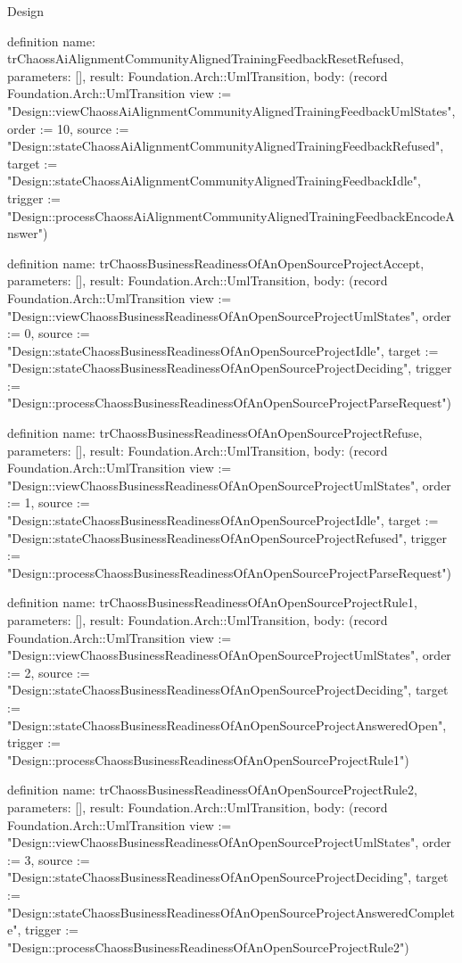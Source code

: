 \begin{lexlean}{Design}
\begin{semanticmodule}
definition{
  name: trChaossAiAlignmentCommunityAlignedTrainingFeedbackResetRefused,
  parameters: [],
  result: Foundation.Arch::UmlTransition,
  body: (record Foundation.Arch::UmlTransition {view := "Design::viewChaossAiAlignmentCommunityAlignedTrainingFeedbackUmlStates", order := 10, source := "Design::stateChaossAiAlignmentCommunityAlignedTrainingFeedbackRefused", target := "Design::stateChaossAiAlignmentCommunityAlignedTrainingFeedbackIdle", trigger := "Design::processChaossAiAlignmentCommunityAlignedTrainingFeedbackEncodeAnswer"})
}

definition{
  name: trChaossBusinessReadinessOfAnOpenSourceProjectAccept,
  parameters: [],
  result: Foundation.Arch::UmlTransition,
  body: (record Foundation.Arch::UmlTransition {view := "Design::viewChaossBusinessReadinessOfAnOpenSourceProjectUmlStates", order := 0, source := "Design::stateChaossBusinessReadinessOfAnOpenSourceProjectIdle", target := "Design::stateChaossBusinessReadinessOfAnOpenSourceProjectDeciding", trigger := "Design::processChaossBusinessReadinessOfAnOpenSourceProjectParseRequest"})
}

definition{
  name: trChaossBusinessReadinessOfAnOpenSourceProjectRefuse,
  parameters: [],
  result: Foundation.Arch::UmlTransition,
  body: (record Foundation.Arch::UmlTransition {view := "Design::viewChaossBusinessReadinessOfAnOpenSourceProjectUmlStates", order := 1, source := "Design::stateChaossBusinessReadinessOfAnOpenSourceProjectIdle", target := "Design::stateChaossBusinessReadinessOfAnOpenSourceProjectRefused", trigger := "Design::processChaossBusinessReadinessOfAnOpenSourceProjectParseRequest"})
}

definition{
  name: trChaossBusinessReadinessOfAnOpenSourceProjectRule1,
  parameters: [],
  result: Foundation.Arch::UmlTransition,
  body: (record Foundation.Arch::UmlTransition {view := "Design::viewChaossBusinessReadinessOfAnOpenSourceProjectUmlStates", order := 2, source := "Design::stateChaossBusinessReadinessOfAnOpenSourceProjectDeciding", target := "Design::stateChaossBusinessReadinessOfAnOpenSourceProjectAnsweredOpen", trigger := "Design::processChaossBusinessReadinessOfAnOpenSourceProjectRule1"})
}

definition{
  name: trChaossBusinessReadinessOfAnOpenSourceProjectRule2,
  parameters: [],
  result: Foundation.Arch::UmlTransition,
  body: (record Foundation.Arch::UmlTransition {view := "Design::viewChaossBusinessReadinessOfAnOpenSourceProjectUmlStates", order := 3, source := "Design::stateChaossBusinessReadinessOfAnOpenSourceProjectDeciding", target := "Design::stateChaossBusinessReadinessOfAnOpenSourceProjectAnsweredComplete", trigger := "Design::processChaossBusinessReadinessOfAnOpenSourceProjectRule2"})
}


\end{semanticmodule}
\end{lexlean}
